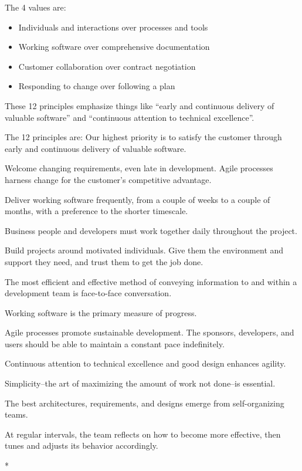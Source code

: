 	The 4 values are:
	\begin{itemize}
		\item Individuals and interactions over processes and tools
		\item Working software over comprehensive documentation
		\item Customer collaboration over contract negotiation
		\item Responding to change over following a plan
	\end{itemize}

	These 12 principles emphasize things like “early and continuous delivery of valuable software” and “continuous attention to technical excellence”.
	
	The 12 principles are:
	Our highest priority is to satisfy the customer
	through early and continuous delivery
	of valuable software.
	
	Welcome changing requirements, even late in
	development. Agile processes harness change for
	the customer's competitive advantage.
	
	Deliver working software frequently, from a
	couple of weeks to a couple of months, with a
	preference to the shorter timescale.
	
	Business people and developers must work
	together daily throughout the project.
	
	Build projects around motivated individuals.
	Give them the environment and support they need,
	and trust them to get the job done.
	
	The most efficient and effective method of
	conveying information to and within a development
	team is face-to-face conversation.
	
	Working software is the primary measure of progress.
	
	Agile processes promote sustainable development.
	The sponsors, developers, and users should be able
	to maintain a constant pace indefinitely.
	
	Continuous attention to technical excellence
	and good design enhances agility.
	
	Simplicity--the art of maximizing the amount
	of work not done--is essential.
	
	The best architectures, requirements, and designs
	emerge from self-organizing teams.
	
	At regular intervals, the team reflects on how
	to become more effective, then tunes and adjusts
	its behavior accordingly.
	
	* 
	
